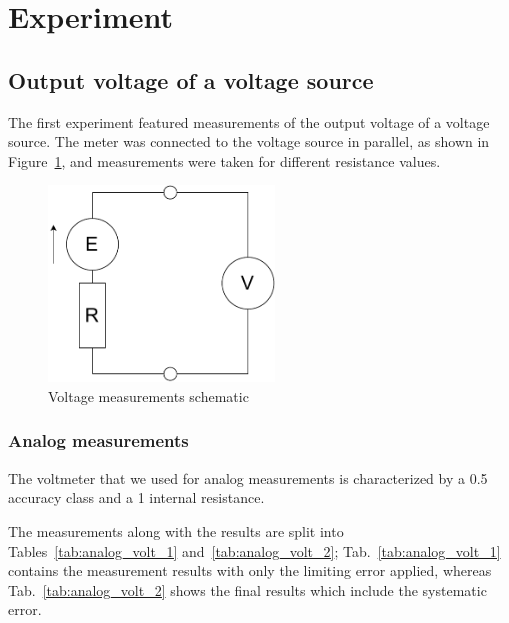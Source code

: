 \section{Experiment}

\subsection{Output voltage of a voltage source}

The first experiment featured measurements of the output voltage of a voltage source. The meter was connected to the voltage source in parallel, as shown in Figure~\ref{fig:voltage_schematic}, and measurements were taken for different resistance values.

\begin{figure}[H]
	\centering
	\includegraphics[width=6cm]{schematics/analog_voltage.pdf}
	\caption{Voltage measurements schematic}
	\label{fig:voltage_schematic}
\end{figure}

\subsubsection*{Analog measurements}

The voltmeter that we used for analog measurements is characterized by a 0.5 accuracy class and a  \SI{1}{\frac{\kilo\ohm}{\volt}} internal resistance.
 
 The measurements along with the results are split into Tables~\ref{tab:analog_volt_1} and~\ref{tab:analog_volt_2}; Tab.~\ref{tab:analog_volt_1} contains the measurement results with only the limiting error applied, whereas Tab.~\ref{tab:analog_volt_2} shows the final results which include the systematic error.

